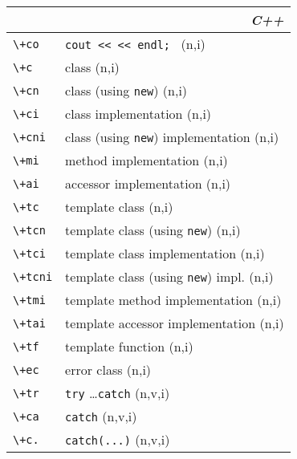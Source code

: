 \documentclass[oneside,10pt,landscape,DIV17]{scrartcl}
\begin{document}
\begin{multicols}{3}
\begin{center}
%
\begin{tabular}[]{|p{11mm}|p{58mm}|}
\hline 
\multicolumn{2}{|r|}{\textsl{C\textbf{+}+}} \\
\hline \verb'\+co'  & \verb'cout << << endl; '                \hfill (n,i)\\
\hline \verb'\+c'   & class                                   \hfill (n,i)\\
\hline \verb'\+cn'  & class (using \verb'new')                \hfill (n,i)\\
\hline \verb'\+ci'  & class  implementation                   \hfill (n,i)\\
\hline \verb'\+cni' & class (using \verb'new') implementation \hfill (n,i)\\
\hline \verb'\+mi'  & method implementation                   \hfill (n,i)\\
\hline \verb'\+ai'  & accessor implementation                 \hfill (n,i)\\
\hline \verb'\+tc'  & template class                          \hfill (n,i)\\
\hline \verb'\+tcn' & template class (using \verb'new')       \hfill (n,i)\\
\hline \verb'\+tci' & template class  implementation          \hfill (n,i)\\
\hline \verb'\+tcni'& template class (using \verb'new') impl. \hfill (n,i)\\
\hline \verb'\+tmi' & template method implementation          \hfill (n,i)\\
\hline \verb'\+tai' & template accessor implementation        \hfill (n,i)\\
\hline \verb'\+tf'  & template function                       \hfill (n,i)\\
\hline \verb'\+ec'  & error class                             \hfill (n,i)\\
\hline \verb'\+tr'  & \verb'try' \dots \verb'catch'           \hfill (n,v,i)\\
\hline \verb'\+ca'  & \verb'catch'                            \hfill (n,v,i)\\
\hline \verb'\+c.'  & \verb'catch(...)'                       \hfill (n,v,i)\\

\end{tabular}
\end{center}
\end{multicols}
\end{document}
